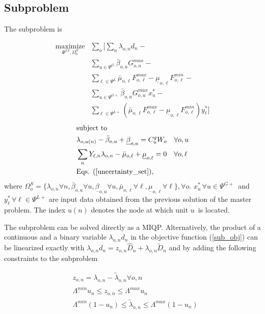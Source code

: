 \subsection{Subproblem}

The subproblem is

\begin{align}
\label{sub_obj} \underset{\Phi^{L2}, \Omega_o^{S}}{\text{maximize}} &\sum\limits_o \Bigg[ \sum\limits_n \lambda_{o, n} d_n - \nonumber \\
&\sum\limits_{u \in \Psi^G} \bar{\beta}_{o,u} G_{o,u}^{max} - \nonumber \\
&\sum\limits_{\ell \in \Psi^L} \bar{\mu}_{o,\ell} F_{o,\ell}^{max} - \underline{\mu}_{o,\ell} F_{o,\ell}^{min} - \nonumber \\
&\sum\limits_{u \in \Psi^{G+}} \bar{\beta}_{o,u} G_{o,u}^{max} x_u^* - \nonumber \\
&\sum\limits_{\ell \in \Psi^{L+}} \left( \bar{\mu}_{o,\ell} F_{o,\ell}^{max} - \underline{\mu}_{o,\ell} F_{o,\ell}^{min} \right) y_\ell^* \Bigg]
\end{align}
\begin{align}
&\text{subject to} \nonumber \\
&\lambda_{o, u(n)} - \bar{\beta}_{o,u} + \underline{\beta}_{o,u} = C^g_u  W_o \quad \forall o, u \\
&\sum\limits_n Y_{\ell, n} \lambda_{o, n} - \bar{\mu}_{o, \ell} + \underline{\mu}_{o, \ell} = 0 \quad \forall o, \ell \\
&\text{Eqs. } (\ref{uncertainty_set}),
\end{align}
where $\Omega^{S}_o = \{ \lambda_{o, n} \forall n, \bar{\beta}_{o,u} \forall u, \underline{\beta}_{o,u} \forall u, \bar{\mu}_{o,\ell} \forall \ell, \underline{\mu}_{o,\ell} \forall \ell \}, \forall o$. $x_u^* \, \forall u \in \Psi^{G+}$ and $y_\ell^* \, \forall \ell \in \Psi^{L+}$ are input data obtained from the previous solution of the master problem. The index $u(n)$ denotes the node at which unit $u$ is located.

The subproblem can be solved directly as a MIQP. Alternatively, the product of a continuous and a binary variable $\lambda_{o, n} d_n$ in the objective function (\ref{sub_obj}) can be linearized exactly with $\lambda_{o, n} d_n = z_{o, n} \hat{D}_n + \lambda_{o, n} \tilde{D}_n$ and by adding the following constraints to the subproblem

\begin{align}
&z_{o,n} = \lambda_{o, n} - \tilde{\lambda}_{o, n} \forall o, n \\
&\Lambda^{min} u_n \leq z_{o, n} \leq \Lambda^{max} u_n \\
&\Lambda^{min} (1 - u_n) \leq \tilde{\lambda}_{o, n} \leq \Lambda^{max} (1 - u_n)
\end{align}

